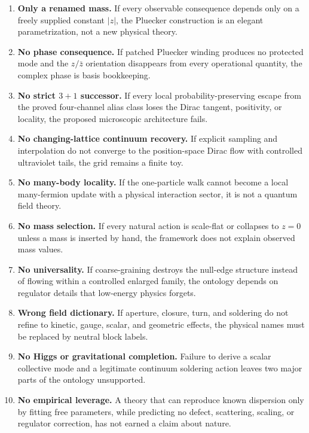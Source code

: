 \documentclass[11pt]{article}
\begin{document}
\begin{enumerate}[leftmargin=1.6em]
  \item \textbf{Only a renamed mass.}  If every observable consequence depends
        only on a freely supplied constant $|z|$, the Pluecker construction is
        an elegant parametrization, not a new physical theory.

  \item \textbf{No phase consequence.}  If patched Pluecker winding produces no
        protected mode and the $z/\bar z$ orientation disappears from every
        operational quantity, the complex phase is basis bookkeeping.

  \item \textbf{No strict $3+1$ successor.}  If every local probability-preserving escape
        from the proved four-channel alias class loses the Dirac tangent,
        positivity, or locality, the proposed microscopic architecture fails.

  \item \textbf{No changing-lattice continuum recovery.}  If explicit sampling
        and interpolation do not converge to the position-space Dirac flow with
        controlled ultraviolet tails, the grid remains a finite toy.

  \item \textbf{No many-body locality.}  If the one-particle walk cannot become
        a local many-fermion update with a physical interaction sector, it is
        not a quantum field theory.

  \item \textbf{No mass selection.}  If every natural action is scale-flat or
        collapses to $z=0$ unless a mass is inserted by hand, the framework does
        not explain observed mass values.

  \item \textbf{No universality.}  If coarse-graining destroys the null-edge
        structure instead of flowing within a controlled enlarged family, the
        ontology depends on regulator details that low-energy physics forgets.

  \item \textbf{Wrong field dictionary.}  If aperture, closure, turn, and
        soldering do not refine to kinetic, gauge, scalar, and geometric
        effects, the physical names must be replaced by neutral block labels.

  \item \textbf{No Higgs or gravitational completion.}  Failure to derive a
        scalar collective mode and a legitimate continuum soldering action
        leaves two major parts of the ontology unsupported.

  \item \textbf{No empirical leverage.}  A theory that can reproduce known
        dispersion only by fitting free parameters, while predicting no defect,
        scattering, scaling, or regulator correction, has not earned a claim
        about nature.
\end{enumerate}
\end{document}
